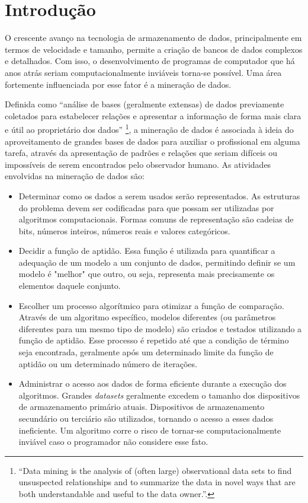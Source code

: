 \chapter{Introdução}

O crescente avanço na tecnologia de armazenamento de dados, principalmente em termos de velocidade e tamanho, permite a criação de bancos de dados complexos e detalhados. Com isso, o desenvolvimento de programas de computador que há anos atrás seriam computacionalmente inviáveis torna-se possível. Uma área fortemente influenciada por esse fator é a mineração de dados.

Definida como ``análise de bases (geralmente extensas) de dados previamente coletados para estabelecer relações e apresentar a informação de forma mais clara e útil ao proprietário dos dados'' \cite[p. 1]{Hand2001}\footnote{``Data mining is the analysis of (often large) observational data sets to find unsuspected relationships and to summarize the data in novel ways that are both understandable and useful to the data owner.''.}, a mineração de dados é associada à ideia do aproveitamento de grandes bases de dados para auxiliar o profissional em alguma tarefa, através da apresentação de padrões e relações que seriam difíceis ou impossíveis de serem encontrados pelo observador humano. As atividades envolvidas na mineração de dados são:

\begin{itemize}
    \item Determinar como os dados a serem usados serão representados. As estruturas do problema devem ser codificadas para que possam ser utilizadas por algoritmos computacionais. Formas comuns de representação são cadeias de bits, números inteiros, números reais e valores categóricos.
    \item Decidir a função de aptidão. Essa função é utilizada para quantificar a adequação de um modelo a um conjunto de dados, permitindo definir se um modelo é "melhor" que outro, ou seja, representa mais precisamente os elementos daquele conjunto.
    \item Escolher um processo algorítmico para otimizar a função de comparação. Através de um algoritmo específico, modelos diferentes (ou parâmetros diferentes para um mesmo tipo de modelo) são criados e testados utilizando a função de aptidão. Esse processo é repetido até que a condição de término seja encontrada, geralmente após um determinado limite da função de aptidão ou um determinado número de iterações.
    \item Administrar o acesso aos dados de forma eficiente durante a execução dos algoritmos. Grandes \emph{datasets} geralmente excedem o tamanho dos dispositivos de armazenamento primário atuais. Dispositivos de armazenamento secundário ou terciário são utilizados, tornando o acesso a esses dados ineficiente. Um algoritmo corre o risco de tornar-se computacionalmente inviável caso o programador não considere esse fato.
\end{itemize}

